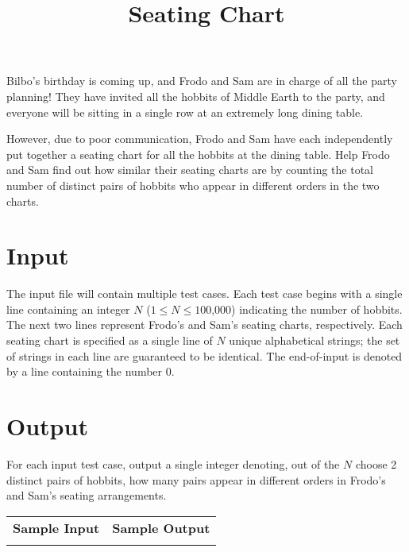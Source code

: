 \documentclass{article}
\title{Seating Chart}
\date{}
\begin{document}
\maketitle

Bilbo's birthday is coming up, and Frodo and Sam are in charge of all the party
planning!  They have invited all the hobbits of Middle Earth to the party, and
everyone will be sitting in a single row at an extremely long dining table.

However, due to poor communication, Frodo and Sam have each independently put
together a seating chart for all the hobbits at the dining table.  Help Frodo
and Sam find out how similar their seating charts are by counting the total
number of distinct pairs of hobbits who appear in different orders in the two
charts.

\section{Input}

The input file will contain multiple test cases.  Each test case begins with a
single line containing an integer $N$ ($1 \le N \le \mbox{100,000}$) indicating the
number of hobbits.  The next two lines represent Frodo's and Sam's seating
charts, respectively.  Each seating chart is specified as a single line of $N$
unique alphabetical strings; the set of strings in each line are guaranteed to
be identical.  The end-of-input is denoted by a line containing the number 0.

\section{Output}

For each input test case, output a single integer denoting, out of the $N$
choose 2 distinct pairs of hobbits, how many pairs appear in different orders
in Frodo's and Sam's seating arrangements.

\vskip 16pt
\noindent
\setlength{\extrarowheight}{4pt}
\begin{tabularx}{\textwidth}{ | X | X | }
\hline
\textbf{Sample Input} & \textbf{Sample Output} \\

&

\\
\hline
\end{tabularx}
\end{document}
